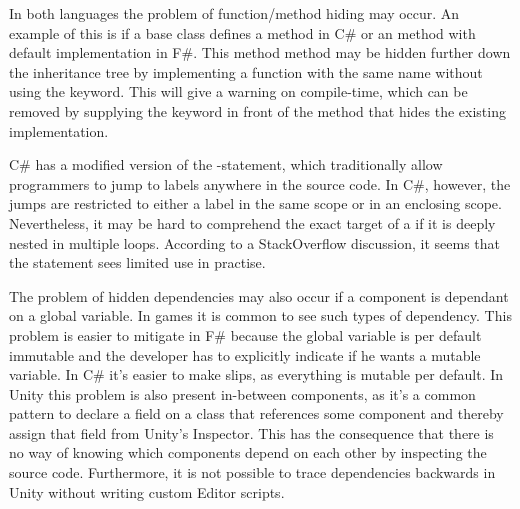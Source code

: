 In both languages the problem of function/method hiding may occur. An example of this is if a base class defines a  method in C\# or an  method with default implementation in F\#. This method method may be hidden further down the inheritance tree by implementing a function with the same name without using the  keyword. This will give a warning on compile-time, which can be removed by supplying the  keyword in front of the method that hides the existing implementation.

C\# has a modified version of the -statement, which traditionally allow programmers to jump to labels anywhere in the source code. In C\#, however, the jumps are restricted to either a label in the same scope or in an enclosing scope\cite{csharp:goto}. Nevertheless, it may be hard to comprehend the exact target of a  if it is deeply nested in multiple loops. According to a StackOverflow discussion\cite{goto:stack:overflow}, it seems that the  statement sees limited use in practise.

The problem of hidden dependencies may also occur if a component is dependant on a global variable. In games it is common to see such types of dependency\cite{blow2004game, guana2015building, nystrom2014game}. This problem is easier to mitigate in F\# because the global variable is per default immutable and the developer has to explicitly indicate if he wants a mutable variable. In C\# it's easier to make slips, as everything is mutable per default. In Unity this problem is also present in-between components, as it's a common pattern to declare a field on a class that references some component and thereby assign that field from Unity's Inspector\cite{unity:inspector:assignment}. This has the consequence that there is no way of knowing which components depend on each other by inspecting the source code. Furthermore, it is not possible to trace dependencies backwards in Unity without writing custom Editor scripts\cite{unity:dependencies:backwards}.